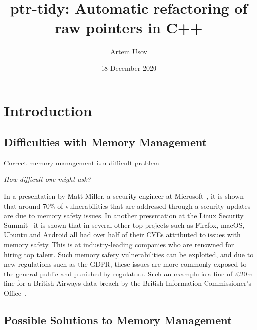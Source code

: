 \documentclass{proposal}
\begin{document}




    \title{ptr-tidy: Automatic refactoring of raw pointers in C++}
    \author{Artem Usov}
    \date{18 December 2020}
    \maketitle
    \tableofcontents
    \newpage




    \section{Introduction}\label{sec:intro}

    \subsection{Difficulties with Memory Management}\label{subsec:difficulties-with-memory-management}


    Correct memory management is a difficult problem.

    \emph{How difficult one might ask?}

    In a presentation by Matt Miller, a security engineer at Microsoft~\cite{Miller2019}, it is shown that around 70\% of vulnerabilities that are addressed through a security updates are due to memory safety issues.
    In another presentation at the Linux Security Summit~\cite{Gaynor2020} it is shown that in several other top projects such as Firefox, macOS, Ubuntu and Android all had over half of their CVEs attributed to issues with memory safety.
    This is at industry-leading companies who are renowned for hiring top talent.
    Such memory safety vulnerabilities can be exploited, and due to new regulations such as the GDPR, these issues are more commonly exposed to the general public and punished by regulators.
    Such an example is a fine of £20m fine for a British Airways data breach by the British Information Commissioner's Office~\cite{ICO2020}.

    \subsection{Possible Solutions to Memory Management}\label{subsec:possible-solutions-to-memory-management}
\end{document}
